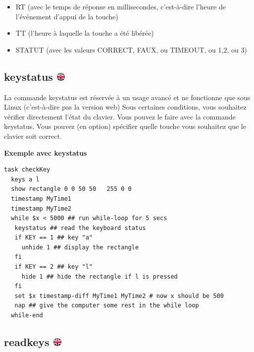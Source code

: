 \documentclass[
]{book}
\providecommand{\tightlist}{%
  \setlength{\itemsep}{0pt}\setlength{\parskip}{0pt}}
\begin{document}
\begin{itemize}
\tightlist
\item
  RT (avec le temps de réponse en millisecondes, c'est-à-dire l'heure de
  l'événement d'appui de la touche)
\item
  TT (l'heure à laquelle la touche a été libérée)
\item
  STATUT (avec les valeurs CORRECT, FAUX, ou TIMEOUT, ou 1,2, ou 3)
\end{itemize}

\hypertarget{keystatus}{%
\subsection[keystatus ]{\texorpdfstring{keystatus
\href{https://www.psytoolkit.org/doc3.2.0/syntax.html\#task-keystatus}{\protect\includegraphics{img/ukflag.png}}}{keystatus }}\label{keystatus}}

La commande keystatus est réservée à un usage avancé et ne fonctionne
que sous Linux (c'est-à-dire pas la version web) Sous certaines
conditions, vous souhaitez vérifier directement l'état du clavier. Vous
pouvez le faire avec la commande keystatus. Vous pouvez (en option)
spécifier quelle touche vous souhaitez que le clavier soit correct.

\textbf{Exemple avec keystatus}

\begin{verbatim}
task checkKey
  keys a l
  show rectangle 0 0 50 50   255 0 0
  timestamp MyTime1
  timestamp MyTime2
  while $x < 5000 ## run while-loop for 5 secs
   keystatus ## read the keyboard status
   if KEY == 1 ## key "a"
     unhide 1 ## display the rectangle
   fi
   if KEY == 2 ## key "l"
     hide 1 ## hide the rectangle if l is pressed
   fi
   set $x timestamp-diff MyTime1 MyTime2 # now x should be 500
   nap ## give the computer some rest in the while loop
  while-end
\end{verbatim}

\hypertarget{readkeys}{%
\subsection[readkeys ]{\texorpdfstring{readkeys
\href{https://www.psytoolkit.org/doc3.2.0/syntax.html\#task-readkeys}{\protect\includegraphics{img/ukflag.png}}}{readkeys }}\label{readkeys}}
\end{document}
